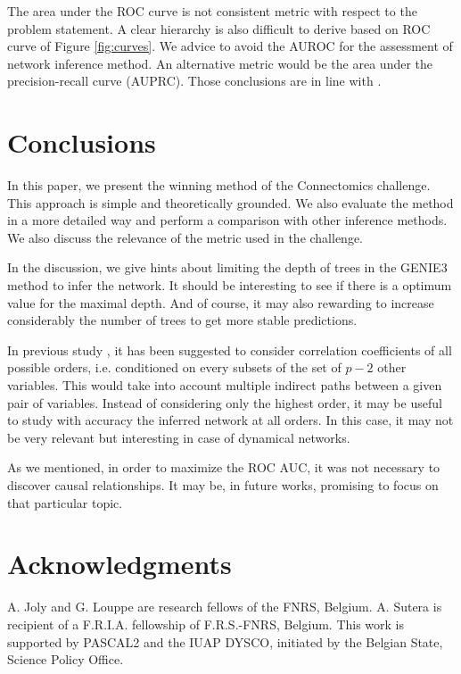 \documentclass[wcp]{jmlr}
\begin{document}
The area under the ROC curve is not consistent metric
with respect to the problem statement. A clear hierarchy is also difficult to
derive based on ROC curve of Figure \ref{fig:curves}. We advice to avoid the AUROC
for the assessment of network inference method. An alternative metric would
be the area under the precision-recall curve (AUPRC). Those
conclusions are in line with \cite{schrynemackers2013protocols}.


\section{Conclusions} \label{sec:conclusion}





In this paper, we present the winning method of the Connectomics challenge.
This approach is simple and theoretically grounded. We also evaluate the method
in a more detailed way and perform a comparison with other inference methods.
We also discuss the relevance of the metric used in the challenge.

In the discussion, we give hints about limiting the depth of trees in the
GENIE3 method to infer the network. It should be interesting to see if there
is a optimum value for the maximal depth. And of course, it may also rewarding
to increase considerably the number of trees to get more stable predictions.

In previous study \citep{shipley2002cause}, it has been suggested to
consider correlation coefficients of all possible orders,
i.e. conditioned on every subsets of the set of $p-2$ other variables. This
would take into account multiple indirect paths between a given pair of
variables. Instead of considering only the highest order, it may be useful to
study with accuracy the inferred network at all orders. In this case, it may not
be very relevant but interesting in case of dynamical networks.

As we mentioned, in order to maximize the ROC AUC, it was not necessary to
discover causal relationships. It may be, in future works, promising to focus
on that particular topic.


\section*{Acknowledgments}
A. Joly and G. Louppe are research fellows of
the FNRS, Belgium.  A. Sutera is recipient of
a F.R.I.A. fellowship of F.R.S.-FNRS, Belgium.
This work is supported by PASCAL2 and the IUAP DYSCO, initiated by the
Belgian State, Science Policy Office.
\end{document}
